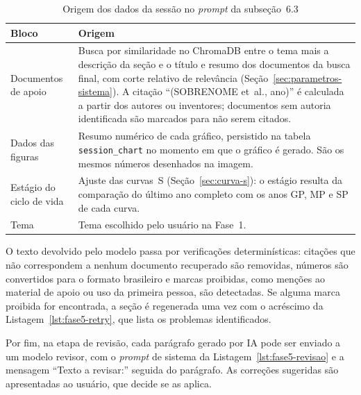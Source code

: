 \documentclass[12pt, a4paper]{article}
\begin{document}


\begin{table}[H]
\centering
\caption{Origem dos dados da sessão no \textit{prompt} da subseção~6.3}
\label{tab:prompt-origem}
\small
\begin{tabular}{>{\raggedright\arraybackslash}p{4.2cm}>{\raggedright\arraybackslash}p{10.2cm}}
\toprule
\textbf{Bloco} & \textbf{Origem} \\
\midrule
Documentos de apoio & Busca por similaridade no ChromaDB entre o tema mais a descrição da seção e o título e resumo dos documentos da busca final, com corte relativo de relevância (Seção~\ref{sec:parametros-sistema}). A citação ``(SOBRENOME et~al., ano)'' é calculada a partir dos autores ou inventores; documentos sem autoria identificada são marcados para não serem citados. \\
Dados das figuras & Resumo numérico de cada gráfico, persistido na tabela \texttt{session\_chart} no momento em que o gráfico é gerado. São os mesmos números desenhados na imagem. \\
Estágio do ciclo de vida & Ajuste das curvas~S (Seção~\ref{sec:curva-s}): o estágio resulta da comparação do último ano completo com os anos GP, MP e SP de cada curva. \\
Tema & Tema escolhido pelo usuário na Fase~1. \\
\bottomrule
\end{tabular}
\end{table}

  O texto devolvido pelo modelo passa por verificações determinísticas:
citações que não correspondem a nenhum documento recuperado são removidas,
números são convertidos para o formato brasileiro e marcas proibidas, como
menções ao material de apoio ou uso da primeira pessoa, são detectadas. Se
alguma marca proibida for encontrada, a seção é regenerada uma vez com o
acréscimo da Listagem~\ref{lst:fase5-retry}, que lista os problemas
identificados.



  Por fim, na etapa de revisão, cada parágrafo gerado por IA pode ser enviado
a um modelo revisor, com o \textit{prompt} de sistema da
Listagem~\ref{lst:fase5-revisao} e a mensagem ``Texto a revisar:'' seguida do
parágrafo. As correções sugeridas são apresentadas ao usuário, que decide se
as aplica.
\end{document}
